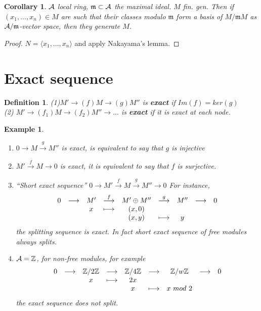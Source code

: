 \documentclass[11pt]{article}
\newtheorem{cor}[thm]{Corollary}
\newtheorem{dfn}[thm]{Definition}
\newtheorem{ex}[thm]{Example}
\newcommand{\intg}{\mathbb Z}
\newcommand{\scm}{{\mathfrak m}}
\newcommand{\cala}{{\cal A}}
\newcommand{\rta}{\rightarrow}
\newcommand{\lrta}{\longrightarrow}
\newcommand{\lgl}{\langle}
\newcommand{\rgl}{\rangle}
\begin{document}
\begin{cor}
$\cala$ local ring, $\scm\subset \cala$ the maximal ideal. $M$ fin. gen. Then if $(x_1,...,x_n)\in M$ are such that their classes modulo $\scm$ form a basis of $M/\scm M$ as $\cala/\scm$-vector space, then they generate $M$.
\end{cor}

\begin{proof}
$N=\lgl x_1,...,x_n\rgl$ and apply Nakayama's lemma.
\end{proof}
\section*{Exact sequence}
\begin{dfn}
(1)$M'\rta(f) M\rta(g) M''$ is \textbf{exact} if $Im(f)=ker(g)$\\
(2) $M'\rta(f_1) M\rta(f_2) M''\rta...$ is \textbf{exact} if it is exact at each node.
\end{dfn}

\begin{ex}\ 
\begin{enumerate}
\item $0\lrta M\overset{g}{\lrta} M''$ is exact, is equivalent to say that $g$ is injective
\item $M'\overset{f}{\lrta}M\lrta 0$ is exact, it is equivalent to say that $f$ is surjective.
\item ``Short exact sequence'' $0\lrta M'\overset{f}{\lrta}M\overset{g}{\lrta}M'' \lrta0$ For instance, 
$$
\begin{array}{ c c c c c c c c c}
0 & \longrightarrow  & M' & \overset{f}{\longrightarrow } & M'\oplus M'' & \overset{g}{\longrightarrow } & M'' & \longrightarrow  & 0\\
 &  & x &\longmapsto  & (x,0) &  &  &  & \\
 &  &  &  & (x,y) & \longmapsto & y &  &
\end{array}
$$
 the splitting sequence is exact. In fact short exact sequence of free modules always splits.
 \item $\cala=\intg$, for non-free modules, for example
 $$
\begin{array}{ c c c c c c c c c}
0 & \longrightarrow  & \intg/2\intg & \longrightarrow  & \intg/4\intg & \longrightarrow  & \intg/w\intg & \longrightarrow  & 0\\
 &  & x &\longmapsto  & 2x &  &  &  & \\
 &  &  &  & x & \longmapsto & x\  mod\ 2 &  &
\end{array}
$$
the exact sequence does not split.
\end{enumerate}
\end{ex}
\end{document}
